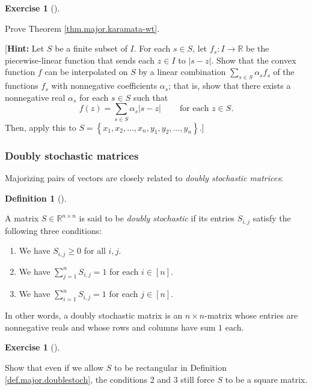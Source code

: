 \documentclass[numbers=enddot,12pt,final,onecolumn,notitlepage]{scrartcl}%
\newcounter{exer}
\numberwithin{exer}{subsection}
\theoremstyle{definition}
\newtheorem{defi}[theo]{Definition}
\newenvironment{definition}[1][]
{\begin{defi}[#1]\begin{leftbar}}
{\end{leftbar}\end{defi}}
\newtheorem{exmp}[exer]{Exercise}
\newenvironment{exercise}[1][]
{\begin{exmp}[#1]\begin{leftbar}}
{\end{leftbar}\end{exmp}}
\let\sumnonlimits\sum
\renewcommand{\sum}{\sumnonlimits\limits}
\begin{document}
\begin{exercise}
\label{exe.major.karamata-wt} Prove Theorem
\ref{thm.major.karamata-wt}.

[\textbf{Hint:} Let $S$ be a finite subset of $I$. For each $s\in S$, let
$f_{s}:I\rightarrow\mathbb{R}$ be the piecewise-linear function that sends
each $z\in I$ to $\left\vert s-z\right\vert $. Show that the convex function
$f$ can be interpolated on $S$ by a linear combination $\sum_{s\in S}%
\alpha_{s}f_{s}$ of the functions $f_{s}$ with nonnegative coefficients
$\alpha_{s}$; that is, show that there exists a nonnegative real $\alpha_{s}$
for each $s\in S$ such that%
\[
f\left(  z\right)  =\sum_{s\in S}\alpha_{s}\left\vert s-z\right\vert
\ \ \ \ \ \ \ \ \ \ \text{for each }z\in S.
\]
Then, apply this to $S=\left\{  x_{1},x_{2},\ldots,x_{n},y_{1},y_{2}%
,\ldots,y_{n}\right\}  $.]
\end{exercise}

\subsubsection{Doubly stochastic matrices}

Majorizing pairs of vectors are closely related to \emph{doubly stochastic
matrices}:

\begin{definition}
\label{def.major.doublestoch}A matrix $S\in\mathbb{R}^{n\times n}$ is said to
be \emph{doubly stochastic} if its entries $S_{i,j}$ satisfy the following
three conditions:

\begin{enumerate}
\item We have $S_{i,j}\geq0$ for all $i,j$.

\item We have $\sum_{j=1}^{n}S_{i,j}=1$ for each $i\in\left[  n\right]  $.

\item We have $\sum_{i=1}^{n}S_{i,j}=1$ for each $j\in\left[  n\right]  $.
\end{enumerate}
\end{definition}

In other words, a doubly stochastic matrix is an $n\times n$-matrix whose
entries are nonnegative reals and whose rows and columns have sum $1$ each.

\begin{exercise}
\label{exe.major.doublestoch.square} Show that even if we allow $S$ to
be rectangular in Definition \ref{def.major.doublestoch}, the conditions 2 and
3 still force $S$ to be a square matrix.
\end{exercise}
\end{document}
